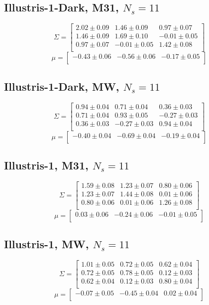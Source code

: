 \documentclass[a4paper,fleqn,usenatbib]{mnras}
\begin{document}
\subsection{Illustris-1-Dark, M31, $N_s=11$}
\[
\Sigma=
\begin{bmatrix}
2.02 \pm 0.09 & 1.46 \pm 0.09 & 0.97 \pm 0.07\\
1.46 \pm 0.09 & 1.69 \pm 0.10 & -0.01 \pm 0.05\\
0.97 \pm 0.07 & -0.01 \pm 0.05 & 1.42 \pm 0.08\\
\end{bmatrix}
\]
\[
\mu=
\begin{bmatrix}
-0.43 \pm 0.06 & -0.56 \pm 0.06 & -0.17 \pm 0.05\\
\end{bmatrix}
\]
\subsection{Illustris-1-Dark, MW, $N_s=11$}
\[
\Sigma=
\begin{bmatrix}
0.94 \pm 0.04 & 0.71 \pm 0.04 & 0.36 \pm 0.03\\
0.71 \pm 0.04 & 0.93 \pm 0.05 & -0.27 \pm 0.03\\
0.36 \pm 0.03 & -0.27 \pm 0.03 & 0.94 \pm 0.04\\
\end{bmatrix}
\]
\[
\mu=
\begin{bmatrix}
-0.40 \pm 0.04 & -0.69 \pm 0.04 & -0.19 \pm 0.04\\
\end{bmatrix}
\]

\subsection{Illustris-1, M31, $N_s=11$}
\[
\Sigma=
\begin{bmatrix}
1.59 \pm 0.08 & 1.23 \pm 0.07 & 0.80 \pm 0.06\\
1.23 \pm 0.07 & 1.44 \pm 0.08 & 0.01 \pm 0.06\\
0.80 \pm 0.06 & 0.01 \pm 0.06 & 1.26 \pm 0.08\\
\end{bmatrix}
\]
\[
\mu=
\begin{bmatrix}
0.03 \pm 0.06 & -0.24 \pm 0.06 & -0.01 \pm 0.05\\
\end{bmatrix}
\]
\subsection{Illustris-1, MW, $N_s=11$}
\[
\Sigma=
\begin{bmatrix}
1.01 \pm 0.05 & 0.72 \pm 0.05 & 0.62 \pm 0.04\\
0.72 \pm 0.05 & 0.78 \pm 0.05 & 0.12 \pm 0.03\\
0.62 \pm 0.04 & 0.12 \pm 0.03 & 0.80 \pm 0.04\\
\end{bmatrix}
\]
\[
\mu=
\begin{bmatrix}
-0.07 \pm 0.05 & -0.45 \pm 0.04 & 0.02 \pm 0.04\\
\end{bmatrix}
\]
\end{document}
